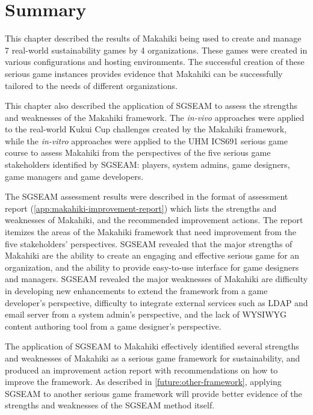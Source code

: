 \section{Summary}

This chapter described the results of Makahiki being used to create and manage 7 real-world sustainability games by 4 organizations. These games were created in various configurations and hosting environments. The successful creation of these serious game instances provides evidence that Makahiki can be successfully tailored to the needs of different organizations.

This chapter also described the application of SGSEAM to assess the strengths and weaknesses of the Makahiki framework. The {\em in-vivo} approaches were applied to the real-world Kukui Cup challenges created by the Makahiki framework, while the {\em in-vitro} approaches were applied to the UHM ICS691 serious game course to assess Makahiki from the perspectives of the five serious game stakeholders identified by SGSEAM: players, system admins, game designers, game managers and game developers.

The SGSEAM assessment results were described in the format of assessment report (\autoref{app:makahiki-improvement-report}) which lists the strengths and weaknesses of Makahiki, and the recommended improvement actions. The report itemizes the areas of the Makahiki framework that need improvement from the five stakeholders' perspectives. SGSEAM revealed that the major strengths of Makahiki are the ability to create an engaging and effective serious game for an organization, and the ability to provide easy-to-use interface for game designers and managers. SGSEAM revealed the major weaknesses of Makahiki are difficulty in developing new enhancements to extend the framework from a game developer's perspective, difficulty to integrate external services such as LDAP and email server from a system admin's perspective, and the lack of WYSIWYG content authoring tool from a game designer's perspective.

The application of SGSEAM to Makahiki effectively identified several strengths and weaknesses of Makahiki as a serious game framework for sustainability, and produced an improvement action report with recommendations on how to improve the framework. As described in \autoref{future:other-framework}, applying SGSEAM to another serious game framework will provide better evidence of the strengths and weaknesses of the SGSEAM method itself. 
